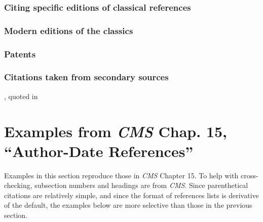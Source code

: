 \documentclass[11pt,letterpaper,oneside]{article}
\begin{document}
\setcounter{subsubsection}{245}
\subsubsection{Citing specific editions of classical references}

\begin{citebib}
\item \cite{epictetus1916}
\end{citebib}

\setcounter{subsubsection}{250}
\subsubsection{Modern editions of the classics}

\begin{citebib}
\item \cite{aristotle1983}
\item \cite{maimonides1965}
\end{citebib}

\setcounter{subsubsection}{257}
\subsubsection{Patents}

\begin{citebib}
\item \cite{iizuka1986}
\end{citebib}

\setcounter{subsubsection}{259}
\subsubsection{Citations taken from secondary sources}

\begin{citebib}
\item \cite[269]{zukofsky1931}, quoted in \cite[78]{costello1981}
\end{citebib}

\section{Examples from \emph{CMS} Chap. 15, ``Author-Date
References''}
\label{paren}

Examples in this section reproduce those in \textit{CMS} Chapter 15.
To help with cross-checking, subsection numbers and headings are from
\textit{CMS}. Since parenthetical citations are relatively simple, and
since the format of references lists is derivative of the default,
the examples below are more selective than those in the previous
section.
\end{document}
